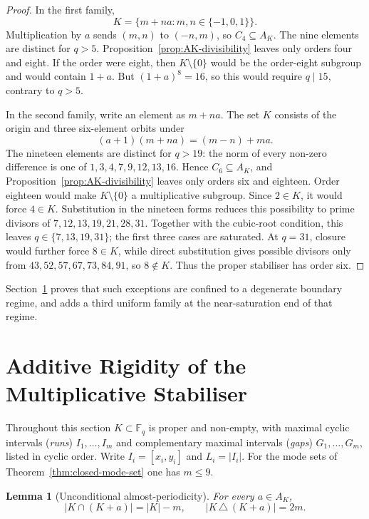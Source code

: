 \documentclass[11pt,a4paper]{article}
\newtheorem{lemma}[theorem]{Lemma}
\theoremstyle{definition}
\theoremstyle{remark}
\newcommand{\Fq}{\mathbb{F}_q}
\begin{document}
\begin{proof}
  In the first family,
  \[
    K=\{m+na:m,n\in\{-1,0,1\}\}.
  \]
  Multiplication by $a$ sends $(m,n)$ to $(-n,m)$, so $C_4\subseteq A_K$.
  The nine elements are distinct for $q>5$.
  Proposition~\ref{prop:AK-divisibility} leaves only orders four and eight.
  If the order were eight, then $K\setminus\{0\}$ would be the order-eight subgroup and
  would contain $1+a$.
  But $(1+a)^8=16$, so this would require $q\mid15$, contrary to $q>5$.

  In the second family, write an element as $m+na$.
  The set $K$ consists of the origin and three six-element orbits under
  \begin{equation}
    (a+1)(m+na)=(m-n)+ma.
    \label{eq:C6-action}
  \end{equation}
  The nineteen elements are distinct for $q>19$: the norm of every non-zero difference
  is one of $1,3,4,7,9,12,13,16$.
  Hence $C_6\subseteq A_K$, and Proposition~\ref{prop:AK-divisibility} leaves only orders
  six and eighteen.
  Order eighteen would make $K\setminus\{0\}$ a multiplicative subgroup.
  Since $2\in K$, it would force $4\in K$.
  Substitution in the nineteen forms reduces this possibility to prime divisors of
  $7,12,13,19,21,28,31$.
  Together with the cubic-root condition, this leaves
  $q\in\{7,13,19,31\}$; the first three cases are saturated.
  At $q=31$, closure would further force $8\in K$, while direct substitution gives
  possible divisors only from $43,52,57,67,73,84,91$, so $8\notin K$.
  Thus the proper stabiliser has order six.
\end{proof}

Section~\ref{sec:rigidity} proves that such exceptions are confined to a degenerate boundary
regime, and adds a third uniform family at the near-saturation end of that regime.

\section{Additive Rigidity of the Multiplicative Stabiliser}
\label{sec:rigidity}

Throughout this section $K\subset\Fq$ is proper and non-empty, with maximal cyclic intervals
(\emph{runs}) $I_1,\ldots,I_m$ and complementary maximal intervals (\emph{gaps})
$G_1,\ldots,G_m$, listed in cyclic order.
Write $I_i=[x_i,y_i]$ and $L_i=|I_i|$.
For the mode sets of Theorem~\ref{thm:closed-mode-set} one has $m\leq9$.

\begin{lemma}[Unconditional almost-periodicity]
  \label{lem:almost-period}
  For every $a\in A_K$,
  \begin{equation}
    |K\cap(K+a)|=|K|-m,
    \qquad
    |K\,\triangle\,(K+a)|=2m.
    \label{eq:almost-period}
  \end{equation}
\end{lemma}
\end{document}
